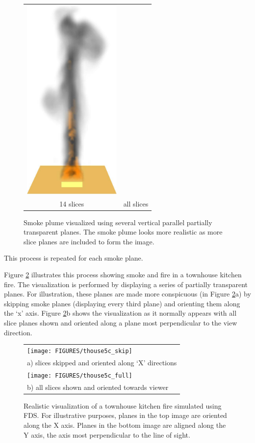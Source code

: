 {\begin{figure}[\figoptions]
\begin{center}
\begin{tabular}{cc}
\includegraphics[height=4.0in]{FIGURES/splume_11_27}\\
14 slices&all slices
\end{tabular}
\end{center}
\caption [Smoke plume visualized using several vertical parallel
partially transparent planes.] {Smoke plume visualized using
several vertical parallel partially transparent planes. The smoke
plume looks more realistic as more slice planes
are included to form the image. } \label{figplume}
\end{figure}

\noindent This process is repeated for each smoke plane.

Figure \ref{figsmoke3d} illustrates this process showing smoke and fire in a townhouse kitchen fire. The visualization is performed by displaying a series of partially transparent planes. For illustration, these planes are made more conspicuous (in Figure \ref{figsmoke3d}a) by skipping smoke planes (displaying every third plane) and orienting them along the `x' axis. Figure \ref{figsmoke3d}b shows the visualization as it normally appears with all slice planes shown and oriented along a
plane most perpendicular to the view direction.

\begin{figure}[\figoptions]
\begin{center}
\begin{tabular}{l}
\texttt{[image: FIGURES/thouse5c\_skip]}\\
a) slices skipped and oriented along `X' directions\\
\texttt{[image: FIGURES/thouse5c\_full]}\\
b) all slices shown and oriented towards viewer \\
\end{tabular}
\end{center}
\caption[Realistic visualization of a townhouse kitchen fire simulated using FDS.]{Realistic visualization of a townhouse kitchen fire simulated using FDS. For illustrative purposes, planes in the top image are oriented along the X axis.  Planes in the bottom image are aligned along the Y axis, the axis most perpendicular to the line of sight.}
\label{figsmoke3d}%
\end{figure}

}
